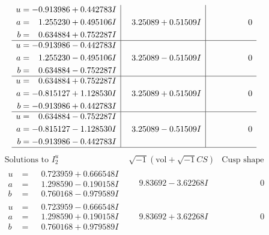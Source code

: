 \documentclass[1p]{elsarticle_modified}
\theoremstyle{definition}
\newcommand{\I}{\sqrt{-1}}
\begin{document}
$$\begin{array}{c|c|c}
\begin{aligned}
u &= -0.913986 + 0.442783 I \\
a &= \phantom{-}1.255230 + 0.495106 I \\
b &= \phantom{-}0.634884 + 0.752287 I\end{aligned}
 & \phantom{-}3.25089 + 0.51509 I & \phantom{-0.000000 } 0 \\ \hline\begin{aligned}
u &= -0.913986 - 0.442783 I \\
a &= \phantom{-}1.255230 - 0.495106 I \\
b &= \phantom{-}0.634884 - 0.752287 I\end{aligned}
 & \phantom{-}3.25089 - 0.51509 I & \phantom{-0.000000 } 0 \\ \hline\begin{aligned}
u &= \phantom{-}0.634884 + 0.752287 I \\
a &= -0.815127 + 1.128530 I \\
b &= -0.913986 + 0.442783 I\end{aligned}
 & \phantom{-}3.25089 + 0.51509 I & \phantom{-0.000000 } 0 \\ \hline\begin{aligned}
u &= \phantom{-}0.634884 - 0.752287 I \\
a &= -0.815127 - 1.128530 I \\
b &= -0.913986 - 0.442783 I\end{aligned}
 & \phantom{-}3.25089 - 0.51509 I & \phantom{-0.000000 } 0\\
 \hline 
 \end{array}$$\newpage$$\begin{array}{c|c|c}  
\text{Solutions to }I^u_{2}& \I (\text{vol} + \sqrt{-1}CS) & \text{Cusp shape}\\
 \hline 
\begin{aligned}
u &= \phantom{-}0.723959 + 0.666548 I \\
a &= \phantom{-}1.298590 - 0.190158 I \\
b &= \phantom{-}0.760168 - 0.979589 I\end{aligned}
 & \phantom{-}9.83692 - 3.62268 I & \phantom{-0.000000 } 0 \\ \hline\begin{aligned}
u &= \phantom{-}0.723959 - 0.666548 I \\
a &= \phantom{-}1.298590 + 0.190158 I \\
b &= \phantom{-}0.760168 + 0.979589 I\end{aligned}
 & \phantom{-}9.83692 + 3.62268 I & \phantom{-0.000000 } 0 \\ \hline\begin{aligned}

\end{aligned}
\end{array}$$
\end{document}
